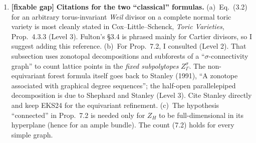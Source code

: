 \documentclass[12pt,letterpaper]{article}
\newcommand{\level}[1]{\textsf{Level #1}}
\newcommand{\verdict}[1]{\textbf{[#1]}}
\begin{document}
\begin{enumerate}[label=\textbf{\arabic*.}]
\item \verdict{fixable gap} \textbf{Citations for the two ``classical'' formulas.}
(a)~Eq.~(3.2) for an arbitrary torus-invariant \emph{Weil} divisor on a complete normal toric variety is most cleanly stated in Cox--Little--Schenck, \emph{Toric Varieties}, Prop.~4.3.3 (\level{3}).  Fulton's \S3.4 is phrased mainly for Cartier divisors, so I suggest adding this reference.
(b)~For Prop.~7.2, I consulted \cite[\S3.1]{EKS24} (\level{2}).  That subsection uses zonotopal decompositions and subforests of a ``$\sigma$-connectivity graph'' to count lattice points in the \emph{fixed subpolytopes} $Z^\sigma_\Gamma$.  The non-equivariant forest formula itself goes back to Stanley (1991), ``A zonotope associated with graphical degree sequences''; the half-open parallelepiped decomposition is due to Shephard and Stanley (\level{3}).  Cite Stanley directly and keep EKS24 for the equivariant refinement.
(c)~The hypothesis ``connected'' in Prop.~7.2 is needed only for $Z_H$ to be full-dimensional in its hyperplane (hence for an ample bundle).  The count (7.2) holds for every simple graph.
\end{enumerate}
\end{document}
